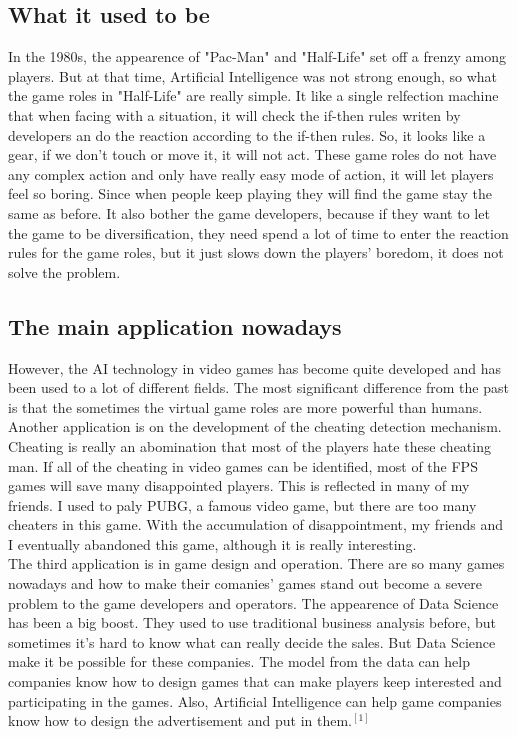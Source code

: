 \documentclass[12pt]{article}
\begin{document}
        \subsection{What it used to be}
            In the 1980s, the appearence of "Pac-Man" and "Half-Life" set off a frenzy among players.
            But at that time, Artificial Intelligence was not strong enough, so what the game roles
            in "Half-Life" are really simple. It like a single relfection machine that when facing
            with a situation, it will check the if-then rules writen by developers an do the reaction
            according to the if-then rules. So, it looks like a gear, if we don't touch or move it,
            it will not act. These game roles do not have any complex action and only have really
            easy mode of action, it will let players feel so boring. Since when people keep playing
            they will find the game stay the same as before. It also bother the game developers,
            because if they want to let the game to be diversification, they need spend a lot of
            time to enter the reaction rules for the game roles, but it just slows down the players'
            boredom, it does not solve the problem.
        \subsection{The main application nowadays}
            However, the AI technology in video games has become quite developed and has been used
            to a lot of different fields. The most significant difference from the past is that the
            sometimes the virtual game roles are more powerful than humans.\\
            
            Another application is on the development of the cheating detection mechanism. Cheating
            is really an abomination that most of the players hate these cheating man. If all of
            the cheating in video games can be identified, most of the FPS games will save many
            disappointed players. This is reflected in many of my friends. I used to paly PUBG,
            a famous video game, but there are too many cheaters in this game. With the accumulation
            of disappointment, my friends and I eventually abandoned this game, although it is
            really interesting.\\
            
            The third application is in game design and operation. There are so many games nowadays
            and how to make their comanies' games stand out become a severe problem to the game
            developers and operators. The appearence of Data Science has been a big boost. They
            used to use traditional business analysis before, but sometimes it's hard to know what
            can really decide the sales. But Data Science make it be possible for these companies.
            The model from the data can help companies know how to design games that can make
            players keep interested and participating in the games. Also, Artificial Intelligence
            can help game companies know how to design the advertisement and put in them$.^{[1]}$
\end{document}
